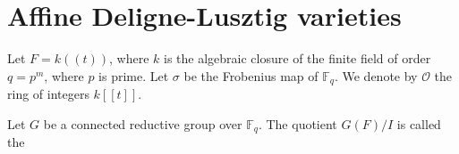 \documentclass[11pt]{article}
\begin{document}
\section{Affine Deligne-Lusztig varieties}

Let $F=k((t))$, where $k$ is the algebraic closure of the finite field of order $q=p^m$, where $p$ is prime. Let $\sigma$ be the Frobenius map of $\mathbb{F}_q$. We denote by $\mathcal{O}$ the ring of integers $k[[t]]$. 


\begin{definition}
    Let $G$ be a connected reductive group over $\mathbb{F}_q$. The quotient $G(F)/I$ is called the 
\end{definition}
\end{document}
